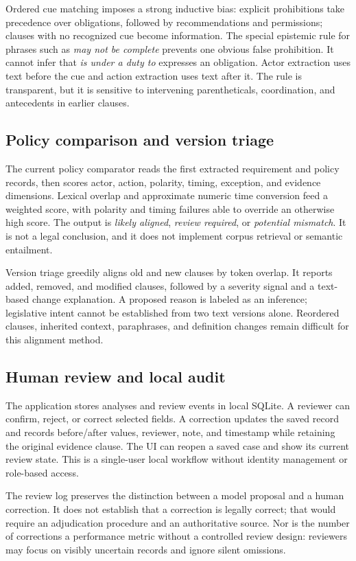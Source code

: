 \documentclass[11pt,a4paper]{article}
\begin{document}
Ordered cue matching imposes a strong inductive bias: explicit prohibitions take precedence over obligations, followed by recommendations and permissions; clauses with no recognized cue become information. The special epistemic rule for phrases such as \emph{may not be complete} prevents one obvious false prohibition. It cannot infer that \emph{is under a duty to} expresses an obligation. Actor extraction uses text before the cue and action extraction uses text after it. The rule is transparent, but it is sensitive to intervening parentheticals, coordination, and antecedents in earlier clauses.

\subsection{Policy comparison and version triage}
The current policy comparator reads the first extracted requirement and policy records, then scores actor, action, polarity, timing, exception, and evidence dimensions. Lexical overlap and approximate numeric time conversion feed a weighted score, with polarity and timing failures able to override an otherwise high score. The output is \emph{likely aligned}, \emph{review required}, or \emph{potential mismatch}. It is not a legal conclusion, and it does not implement corpus retrieval or semantic entailment.

Version triage greedily aligns old and new clauses by token overlap. It reports added, removed, and modified clauses, followed by a severity signal and a text-based change explanation. A proposed reason is labeled as an inference; legislative intent cannot be established from two text versions alone. Reordered clauses, inherited context, paraphrases, and definition changes remain difficult for this alignment method.

\subsection{Human review and local audit}
The application stores analyses and review events in local SQLite. A reviewer can confirm, reject, or correct selected fields. A correction updates the saved record and records before/after values, reviewer, note, and timestamp while retaining the original evidence clause. The UI can reopen a saved case and show its current review state. This is a single-user local workflow without identity management or role-based access.

The review log preserves the distinction between a model proposal and a human correction. It does not establish that a correction is legally correct; that would require an adjudication procedure and an authoritative source. Nor is the number of corrections a performance metric without a controlled review design: reviewers may focus on visibly uncertain records and ignore silent omissions.
\end{document}
